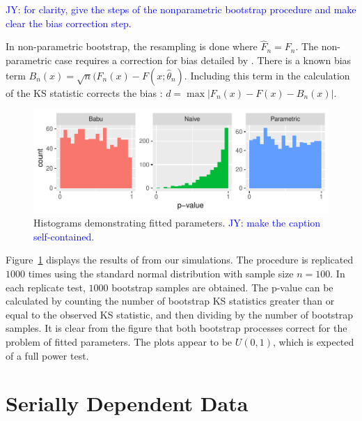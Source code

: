 \documentclass[12pt, letterpaper, titlepage]{article}
\newcommand{\jy}[1]{\textcolor{blue}{JY: #1}}
\begin{document}

\jy{for clarity, give the steps of the nonparametric bootstrap procedure and
  make clear the bias correction step.}

In non-parametric bootstrap, the resampling is done where $\hat{F}_n = F_n$. The non-parametric
case requires a correction for bias detailed by \citet{Babu}. There is a known bias
term $B_{n}(x) = \sqrt{n}(F_{n}(x) - F(x;\hat{\theta}_n)$. Including this term in the
calculation of the KS statistic corrects the bias \citet{Babu}:
$d = \max\lvert F_{n}(x) - F(x) - B_{n}(x) \rvert$.


\begin{figure}[tbp]
  \centering
  \includegraphics[width=\textwidth]{hist_fitted}
  \caption{Histograms demonstrating fitted parameters. \jy{make the caption self-contained.}}
  \label{fig:hist_fitted}
\end{figure}

Figure~\ref{fig:hist_fitted} displays the results of from our simulations. The procedure 
is replicated $1000$ times using the standard normal distribution with sample size $n=100$. 
In each replicate test, $1000$ bootstrap samples are obtained. The p-value can be calculated
by counting the number of bootstrap KS statistics greater than or equal to the observed KS statistic, 
and then dividing by the number of bootstrap samples. It is clear from the figure that both
bootstrap processes correct for the problem of fitted parameters. The plots appear to be
$U(0,1)$, which is expected of a full power test.

\section{Serially Dependent Data}\label{sec:dependence}
\end{document}
